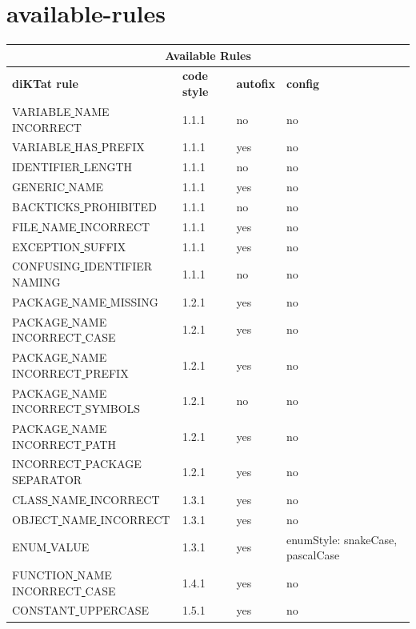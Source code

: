 \section*{available-rules}
\scriptsize
\begin{longtable}{ |l|p{0.8cm}|p{0.8cm}| p{3cm} | }
\hline
\multicolumn{4}{|c|}{Available Rules} \\ 
\hline
\textbf{diKTat rule} & \textbf{code style} & \textbf{autofix} &  \textbf{config} \\
\hline
VARIABLE\underline{ }NAME\underline{ }INCORRECT & 1.1.1 &  no  &   no  \\
VARIABLE\underline{ }HAS\underline{ }PREFIX & 1.1.1 &  yes  &   no  \\
IDENTIFIER\underline{ }LENGTH & 1.1.1 &  no  &   no  \\
GENERIC\underline{ }NAME & 1.1.1 &  yes  &   no  \\
BACKTICKS\underline{ }PROHIBITED & 1.1.1 &  no  &   no  \\
FILE\underline{ }NAME\underline{ }INCORRECT & 1.1.1 &  yes  &   no  \\
EXCEPTION\underline{ }SUFFIX & 1.1.1 &  yes  &   no  \\
CONFUSING\underline{ }IDENTIFIER\underline{ }NAMING & 1.1.1 &  no  &   no  \\
PACKAGE\underline{ }NAME\underline{ }MISSING & 1.2.1 &  yes  &   no  \\
PACKAGE\underline{ }NAME\underline{ }INCORRECT\underline{ }CASE & 1.2.1 &  yes  &   no  \\
PACKAGE\underline{ }NAME\underline{ }INCORRECT\underline{ }PREFIX & 1.2.1 &  yes  &   no  \\
PACKAGE\underline{ }NAME\underline{ }INCORRECT\underline{ }SYMBOLS & 1.2.1 &  no  &   no  \\
PACKAGE\underline{ }NAME\underline{ }INCORRECT\underline{ }PATH & 1.2.1 &  yes  &   no  \\
INCORRECT\underline{ }PACKAGE\underline{ }SEPARATOR & 1.2.1 &  yes  &   no  \\
CLASS\underline{ }NAME\underline{ }INCORRECT & 1.3.1 &  yes  &   no  \\
OBJECT\underline{ }NAME\underline{ }INCORRECT & 1.3.1 &  yes  &   no  \\
ENUM\underline{ }VALUE & 1.3.1 &  yes  &   enumStyle: snakeCase, pascalCase  \\
FUNCTION\underline{ }NAME\underline{ }INCORRECT\underline{ }CASE & 1.4.1 &  yes  &   no  \\
CONSTANT\underline{ }UPPERCASE & 1.5.1 &  yes  &   no  \\

\end{longtable}
